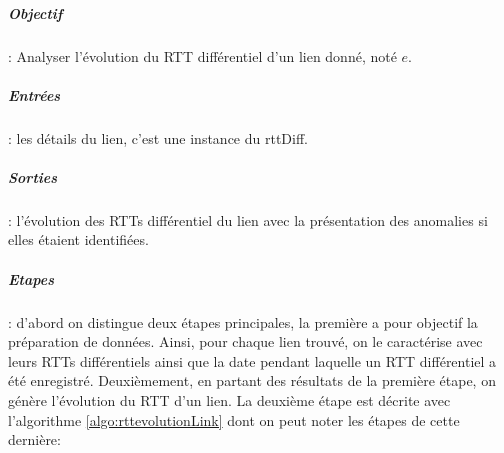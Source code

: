 \subparagraph{Objectif}  : Analyser l'évolution du RTT différentiel d'un lien donné, noté $e$.

\subparagraph{Entrées} : les détails du lien, c'est une instance du rttDiff. 

\subparagraph{Sorties} : l'évolution des RTTs différentiel du lien avec la présentation des anomalies si elles étaient identifiées.

\subparagraph{Etapes} : d'abord on distingue deux étapes principales, la première a pour objectif la préparation de données. Ainsi, pour chaque lien trouvé, on le caractérise avec leurs RTTs différentiels ainsi que la date pendant laquelle un RTT différentiel a été enregistré. Deuxièmement, en partant des résultats de la première étape, on génère l'évolution du RTT d'un lien. La deuxième étape est décrite avec l'algorithme \ref{algo:rttevolutionLink} dont on peut noter les étapes de cette dernière:

